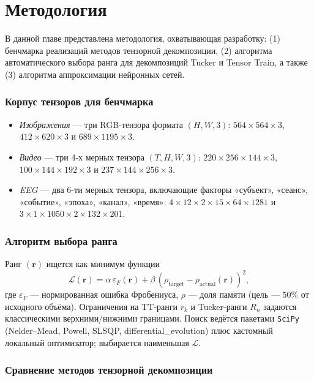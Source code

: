 \chapter{Методология}
\label{chap:methodology}

В данной главе представлена методология, охватывающая разработку: (1) бенчмарка реализаций методов тензорной декомпозиции, (2) алгоритма автоматического выбора ранга для декомпозиций Tucker и Tensor Train, а также (3) алгоритма аппроксимации нейронных сетей.

\subsection*{Корпус тензоров для бенчмарка}
\begin{itemize}\setlength\itemsep{0.15em}
    \item \emph{Изображения} — три RGB-тензора формата \((H,W,3)\): $564\times564\times3$, $412\times620\times3$ и $689\times1195\times3$.  
    \item \emph{Видео} — три 4-х мерных тензора \((T,H,W,3)\): $220\times256\times144\times3$, $100\times144\times192\times3$ и $237\times144\times256\times3$.  
    \item \emph{EEG} — два 6-ти мерных тензора, включающие факторы «субъект», «сеанс», «событие», «эпоха», «канал», «время»: $4\times12\times2\times15\times64\times1281$ и $3\times1\times1050\times2\times132\times201$.
\end{itemize}

\subsection*{Алгоритм выбора ранга}
Ранг $(\mathbf r)$ ищется как минимум функции  
\begin{equation}
    \label{eq:loss_function_select_rank}
\mathcal{L}(\mathbf r)=
\alpha\,\varepsilon_F(\mathbf r)+
\beta\,(\rho_{\text{target}}-\rho_{\text{actual}}(\mathbf r))^{2},
\end{equation}
где $\varepsilon_F$ — нормированная ошибка Фробениуса,  
$\rho$ — доля памяти (цель — $50\%$ от исходного объёма).  
Ограничения на TT-ранги $r_k$ и Tucker-ранги $R_n$ задаются классическими верхними/нижними границами.  
Поиск ведётся пакетами \texttt{SciPy} (Nelder–Mead, Powell, SLSQP, differential\_evolution) плюс кастомный локальный оптимизатор; выбирается наименьшая $\mathcal{L}$.

\subsection*{Сравнение методов тензорной декомпозиции}

